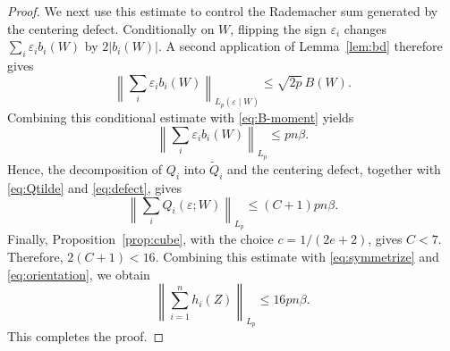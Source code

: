 \documentclass[10pt,a4paper]{amsart}
\newcommand{\abs}[1]{\left\lvert #1\right\rvert}
\newcommand{\norm}[1]{\left\lVert #1\right\rVert}
\begin{document}
\begin{proof}
We next use this estimate to control the Rademacher sum generated by the centering defect. Conditionally on $W$, flipping the sign $\varepsilon_i$ changes $\sum_i\varepsilon_i b_i(W)$ by $2\abs{b_i(W)}$. A second application of Lemma~\ref{lem:bd} therefore gives
\[
\norm{\sum_i\varepsilon_i b_i(W)}_{L_p(\varepsilon\mid W)}
\le
\sqrt{2p}\,B(W).
\]
Combining this conditional estimate with \eqref{eq:B-moment} yields
\begin{equation}\label{eq:defect}
\norm{\sum_i\varepsilon_i b_i(W)}_{L_p} \le pn\beta.
\end{equation}
Hence, the decomposition of $Q_i$ into $\widetilde Q_i$ and the centering defect, together with \eqref{eq:Qtilde} and \eqref{eq:defect}, gives
\[
\norm{\sum_iQ_i(\varepsilon;W)}_{L_p} \le (C+1)pn\beta.
\]
Finally, Proposition~\ref{prop:cube}, with the choice
$c=1/(2e+2)$, gives $C<7$. Therefore, $2(C+1) < 16.$ Combining this estimate with \eqref{eq:symmetrize} and
\eqref{eq:orientation}, we obtain
\[
\norm{\sum_{i=1}^n h_i(Z)}_{L_p} \le 16pn\beta.
\]
This completes the proof.
\end{proof}
\end{document}
